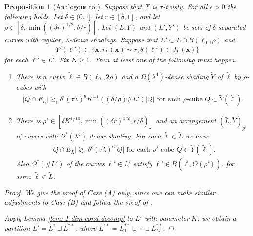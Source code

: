 \documentclass[12pt]{amsart}
\newcommand{\x}{{\bf{x}}}
\numberwithin{equation}{section}
\newtheorem{proposition}[lemma]{Proposition}
\newcommand{\1}{\mathbbm{1}}
\renewcommand{\x}{\mathbf x}
\begin{document}
\begin{proposition}[Analogous to ]\label{prop: narrow prop}
    Suppose that $X$ is $\tau$-twisty. 
    For all $\epsilon > 0$ the following holds. Let $\delta \in (0,1]$, let $r \in [\delta, 1]$, and let $\rho \in [\delta, \min((\delta r)^{1/2}, \delta/r)]$. Let $(L,Y)$ and $(L',Y')$ be sets of $\delta$-separated curves with regular, $\lambda$-dense shadings. Suppose that $L' \subset L \cap B(\ell_0, \rho)$ and 
    \begin{align}
        Y'(\ell') \subset \{\x : r_L(\x) \sim r, \theta(\ell') \in J_L(\x) \}
    \end{align}
    for each $\ell' \in L'$. Fix $K \geq 1$. Then at least one of the following must happen.
    \begin{enumerate}
        \item[(A)] There is a curve $\tilde \ell \in B(\ell_0, 2\rho)$ and a $\Omega(\lambda^4)$-dense shading $\tilde Y$ of $\tilde \ell$ by $\rho$-cubes with 
        \begin{align}
            |Q \cap E_L| \gtrsim_\epsilon \delta^{\epsilon} (\tau\lambda)^6 K^{-1} ((\delta/\rho) \# L') |Q| \text{ for each $\rho$-cube $Q \subset \tilde Y(\tilde \ell)$.}
        \end{align}
        \item[(B)] There is $\rho' \in [\delta K^{1/10}, \min((\delta r)^{1/2}, r / \delta)]$ and an arrangement $(\tilde L, \tilde Y)_{
        \rho'}$ of curves with $\Omega^*(\lambda^4)$-dense shading. For each $\tilde \ell \in \tilde L$ we have 
        \begin{align}
            |Q \cap E_L| \gtrsim_\epsilon  \delta^\epsilon (\tau \lambda)^6  |Q| \text{ for each $\rho'$-cube $Q \subset \tilde Y(\tilde \ell)$.} 
        \end{align}
        Also $\Omega^*(\# L')$ of the curves $\ell' \in L'$ satisfy $
        \ell' \in B(\tilde \ell, O(\rho'))$, for some $\tilde \ell \in \tilde L$.
    \end{enumerate}
    \begin{proof}
        We give the proof of Case (A) only, since one can make similar adjustments to Case (B) and follow the proof of \cite[Proposition 3.3]{KWZ}. 

        Apply Lemma \ref{lem: 1 dim cond decomp} to $L'$ with parameter $K$; we obtain a partition $L' = L^* \sqcup L^{**}$, where $L^{**} = L_1^{**} \sqcup \cdots \sqcup L_M^{**}$. 

        \medskip
        

\end{proof}
\end{proposition}
\end{document}
